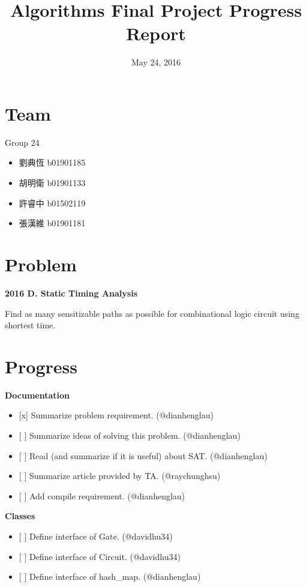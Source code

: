 \documentclass[]{article}
\title{Algorithms Final Project Progress Report}
\date{May 24, 2016}
\providecommand{\tightlist}{%
  \setlength{\itemsep}{0pt}\setlength{\parskip}{0pt}}
\begin{document}
\maketitle

\section{Team}\label{team}

Group 24

\begin{itemize}
\tightlist
\item
  劉典恆 b01901185
\item
  胡明衛 b01901133
\item
  許睿中 b01502119
\item
  張漢維 b01901181
\end{itemize}

\section{Problem}\label{problem}

\textbf{2016 D. Static Timing Analysis}

Find as many sensitizable paths as possible for combinational logic
circuit using shortest time.

\section{Progress}\label{progress}

\textbf{Documentation}

\begin{itemize}
\tightlist
\item
  {[}x{]} Summarize problem requirement. (@dianhenglau)
\item
  {[} {]} Summarize ideas of solving this problem. (@dianhenglau)
\item
  {[} {]} Read (and summarize if it is useful) about SAT. (@dianhenglau)
\item
  {[} {]} Summarize article provided by TA. (@raychunghsu)
\item
  {[} {]} Add compile requirement. (@dianhenglau)
\end{itemize}

\textbf{Classes}

\begin{itemize}
\tightlist
\item
  {[} {]} Define interface of Gate. (@davidhu34)
\item
  {[} {]} Define interface of Circuit. (@davidhu34)
\item
  {[} {]} Define interface of hash\_map. (@dianhenglau)
\end{itemize}
\end{document}

